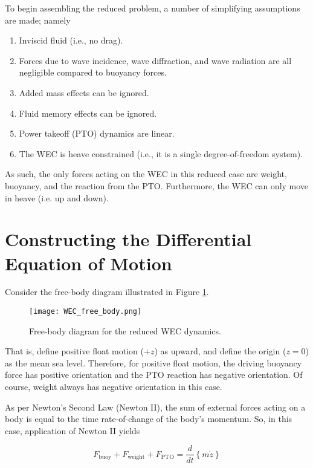 To begin assembling the reduced problem, a number of simplifying assumptions are made; namely

\begin{enumerate}
	\item Inviscid fluid (i.e., no drag).
	\item Forces due to wave incidence, wave diffraction, and wave radiation are all negligible compared to buoyancy forces.
	\item Added mass effects can be ignored.
	\item Fluid memory effects can be ignored.
	\item Power takeoff (PTO) dynamics are linear.
	\item The WEC is heave constrained (i.e., it is a single degree-of-freedom system).
\end{enumerate}

\noindent As such, the only forces acting on the WEC in this reduced case are weight, buoyancy, and the reaction from the PTO. Furthermore, the WEC can only move in heave (i.e. up and down).

\section{Constructing the Differential Equation of Motion}

Consider the free-body diagram illustrated in Figure \ref{fig:WEC_free_body}.

\begin{figure}[H]
    \centering
    \texttt{[image: WEC\_free\_body.png]}
    \caption{Free-body diagram for the reduced WEC dynamics.}
    \label{fig:WEC_free_body}
\end{figure}

\noindent That is, define positive float motion ($+z$) as upward, and define the origin ($z=0$) as the mean sea level. Therefore, for positive float motion, the driving buoyancy force has positive orientation and the PTO reaction has negative orientation. Of course, weight always has negative orientation in this case.\par 
As per Newton's Second Law (Newton II), the sum of external forces acting on a body is equal to the time rate-of-change of the body's momentum. So, in this case, application of Newton II yields

\begin{equation}
	F_\textrm{buoy} + F_\textrm{weight} + F_\textrm{PTO} = \frac{d}{dt}\left\{m\dot{z}\right\}
	\label{eqn:Newton_II}
\end{equation}

